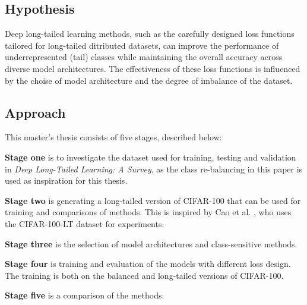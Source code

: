 \subsection{Hypothesis}
Deep long-tailed learning methods, such as the carefully designed loss functions tailored for long-tailed ditributed datasets, can improve the performance of underrepresented (tail) classes while maintaining the overall accuracy across diverse model architectures. The effectiveness of these loss functions is influenced by the choise of model architecture and the degree of imbalance of the dataset.


\subsection{Approach}
This master's thesis consists of five stages, described below:  
\vspace{1em}

\noindent \textbf{Stage one} is to investigate the dataset used for training, testing and validation in \textit{Deep Long-Tailed Learning: A Survey}, as the class re-balancing in this paper is used as inspiration for this thesis.
\vspace{1em}

\noindent \textbf{Stage two} is generating a long-tailed version of CIFAR-100 that can be used for training and comparisons of methods. This is inspired by Cao et al. \cite{cao2019learningimbalanceddatasetslabeldistributionaware}, who uses the CIFAR-100-LT dataset for experiments.
\vspace{1em}

\noindent \textbf{Stage three} is the selection of model architectures and class-sensitive methods.
\vspace{1em}

\noindent \textbf{Stage four} is training and evaluation of the models with different loss design. The training is both on the balanced and long-tailed versions of CIFAR-100.
\vspace{1em}

\noindent \textbf{Stage five} is a comparison of the methods.
\vspace{1em}




